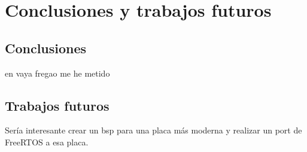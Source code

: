 \chapter{Conclusiones y trabajos futuros}
\section{Conclusiones}
en vaya fregao me he metido

\section{Trabajos futuros}
Sería interesante crear un bsp para una placa más moderna y realizar un port de FreeRTOS a esa placa.


